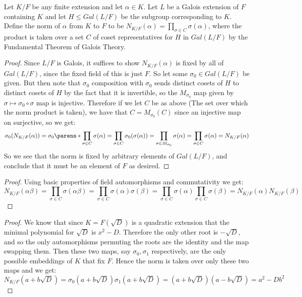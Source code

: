 \documentclass[11pt]{article}
\begin{document}
Let $K/F$ be any finite extension and let $\alpha \in K$. Let $L$ be a Galois extension of $F$ containing $K$ and let $H \le Gal(L/F)$ be the subgroup corresponding to $K$.
Define the norm of $\alpha$ from $K$ to $F$ to be $N_{K/F}(\alpha) = \prod_{\sigma \in C} \sigma(\alpha)$, where the product is taken over a set $C$ of coset representatives for $H$ in $Gal(L/F)$ by the Fundamental Theorem of Galois Theory.

\begin{proof}
  Since $L/F$ is Galois, it suffices to show $N_{K/F}(\alpha)$ is fixed by all of $Gal(L/F)$, since the fixed field of this is just $F$.
  So let some $\sigma_0 \in Gal(L/F)$ be given.
  But then note that $\sigma_0$ composition with $\sigma_0$ sends distinct cosets of $H$ to distinct cosets of $H$ by the fact that it is invertible, so the $M_{\sigma_0}$ map given by $\sigma \mapsto \sigma_0 \circ \sigma$ map is injective.
  Therefore if we let $C$ be as above (The set over which the norm product is taken), we have that $C = M_{\sigma_0}(C)$ since an injective map on surjective, so we get:
  \begin{equation*}
    \sigma_0(N_{K/F}(\alpha))
    = \sigma_0\parens*{\prod_{\sigma \in C} \sigma(\alpha)}
    = \prod_{\sigma \in C} \sigma_0(\sigma(\alpha))
    = \prod_{\sigma \in M_{\sigma_0}} \sigma(\alpha)
    = \prod_{\sigma \in C} \sigma(\alpha)
    = N_{K/F}(\alpha)
  \end{equation*}
  So we see that the norm is fixed by arbitrary elements of $Gal(L/F)$, and conclude that it must be an element of $F$ as desired.
\end{proof}

\begin{proof}
  Using basic properties of field automorphisms and commutativity we get:
  \begin{equation*}
    N_{K/F}(\alpha\beta)
    = \prod_{\sigma \in C} \sigma(\alpha\beta)
    = \prod_{\sigma \in C} \sigma(\alpha)\sigma(\beta)
    = \prod_{\sigma \in C} \sigma(\alpha)\prod_{\sigma \in C} \sigma(\beta)
    = N_{K/F}(\alpha)N_{K/F}(\beta)
  \end{equation*}
\end{proof}

\begin{proof}
  We know that since $K = F(\sqrt{D})$ is a quadratic extension that the minimal polynomial for $\sqrt{D}$ is $x^2 - D$.
  Therefore the only other root is $-\sqrt{D}$, and so the only automorphisms permuting the roots are the identity and the map swapping them.
  Then these two maps, say $\sigma_0, \sigma_1$ respectively, are the only possible embeddings of $K$ that fix $F$.
  Hence the norm is taken over only these two maps and we get:
  \begin{equation*}
    N_{K/F}(a + b\sqrt{D})
    = \sigma_0(a + b\sqrt{D}) \sigma_1(a + b\sqrt{D})
    = (a + b\sqrt{D})(a - b\sqrt{D})
    = a^2 - Db^2
  \end{equation*}
\end{proof}
\end{document}
